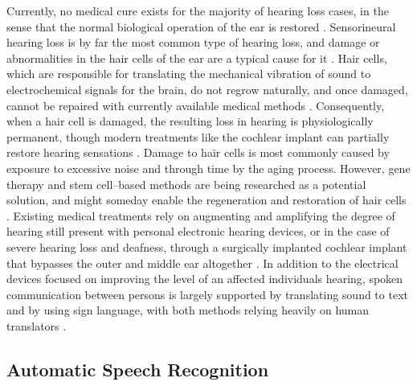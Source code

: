 \documentclass[english, 12pt, a4paper, pdftex, elec, utf8]{aaltothesis}
\begin{document}
Currently, no medical cure exists for the majority of hearing loss cases, in the sense that the normal biological operation of the ear is restored \cite{moore2007cochlear}. Sensorineural hearing loss is by far the most common type of hearing loss, and damage or abnormalities in the hair cells of the ear are a typical cause for it \cite{moore2007cochlear, koskela2013kuulokojeen}. Hair cells, which are responsible for translating the mechanical vibration of sound to electrochemical signals for the brain, do not regrow naturally, and once damaged, cannot be repaired with currently available medical methods \cite{moore2007cochlear}. Consequently, when a hair cell is damaged, the resulting loss in hearing is physiologically permanent, though modern treatments like the cochlear implant can partially restore hearing sensations \cite{moore2007cochlear, peterson2010cochlear}. Damage to hair cells is most commonly caused by exposure to excessive noise and through time by the aging process. However, gene therapy and stem cell--based methods are being researched as a potential solution, and might someday enable the regeneration and restoration of hair cells  \cite{mclean2017clonal}. Existing medical treatments rely on augmenting and amplifying the degree of hearing still present with personal electronic hearing devices, or in the case of severe hearing loss and deafness, through a surgically implanted cochlear implant that bypasses the outer and middle ear altogether \cite{moore2007cochlear}. In addition to the electrical devices focused on improving the level of an affected individuals hearing, spoken communication between persons is largely supported by translating sound to text and by using sign language, with both methods relying heavily on human translators \cite{moore2007cochlear, raino2012sisakorvaistutteen}.

\subsection{Automatic Speech Recognition}
\end{document}
